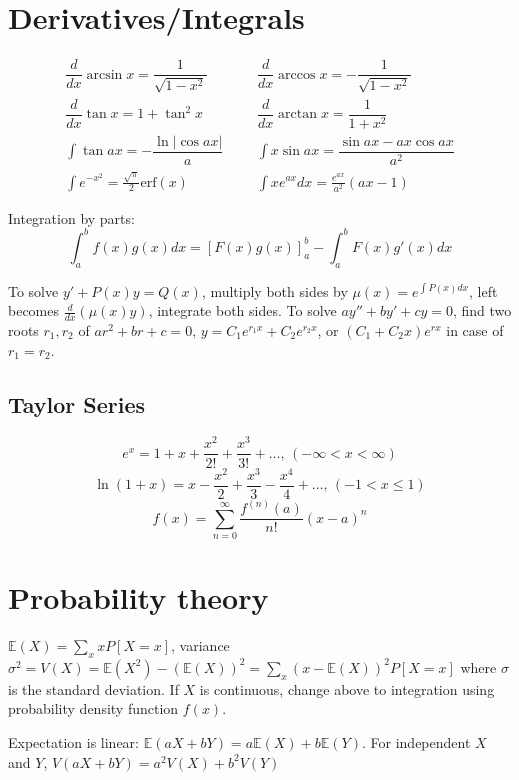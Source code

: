 
\section{Derivatives/Integrals}
\begin{align*}
	\dfrac{d}{dx}\arcsin x = \dfrac{1}{\sqrt{1-x^2}} &&& \dfrac{d}{dx}\arccos x = -\dfrac{1}{\sqrt{1-x^2}} \\
	\dfrac{d}{dx}\tan x = 1+\tan^2 x &&& \dfrac{d}{dx}\arctan x = \dfrac{1}{1+x^2} \\
	\int\tan ax = -\dfrac{\ln|\cos ax|}{a} &&& \int x\sin ax = \dfrac{\sin ax-ax \cos ax}{a^2} \\
	\int e^{-x^2} = \frac{\sqrt \pi}{2} \text{erf}(x) &&& \int xe^{ax}dx = \frac{e^{ax}}{a^2}(ax-1)
\end{align*}

Integration by parts:
\[\int_a^bf(x)g(x)dx = [F(x)g(x)]_a^b-\int_a^bF(x)g'(x)dx\]

To solve $y'+P(x)y=Q(x)$, multiply both sides by $\mu(x)=e^{\int P(x)dx}$, left becomes $\frac{d}{dx}(\mu(x)y)$, integrate both sides.
To solve $ay''+by'+cy=0$, find two roots $r_1,r_2$ of $ar^2+br+c=0$, $y=C_1e^{r_1x}+C_2e^{r_2x}$, or $(C_1+C_2x)e^{rx}$ in case of $r_1=r_2$.

\subsection{Taylor Series}
$$e^x = 1+x+\frac{x^2}{2!}+\frac{x^3}{3!}+\dots,\,(-\infty<x<\infty)$$
$$\ln(1+x) = x-\frac{x^2}{2}+\frac{x^3}{3}-\frac{x^4}{4}+\dots,\,(-1<x\leq1)$$
$$f(x) = \sum_{n=0}^{\infty} \frac{f^{(n)}(a)}{n!} (x - a)^n$$

\section{Probability theory}
$\mathbb{E}(X)=\sum_xxP[X=x]$, variance $\sigma^2=V(X)=\mathbb{E}(X^2)-(\mathbb{E}(X))^2=\sum_x(x-\mathbb{E}(X))^2P[X=x]$ where $\sigma$ is the standard deviation. If $X$ is continuous, change above to integration using probability density function $f(x)$.

Expectation is linear: $\mathbb{E}(aX+bY) = a\mathbb{E}(X)+b\mathbb{E}(Y)$. For independent $X$ and $Y$, $V(aX+bY) = a^2V(X)+b^2V(Y)$
